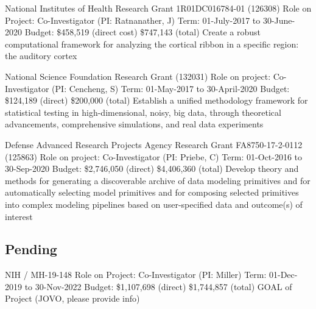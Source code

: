 \documentclass[10pt,colorlinks=true,urlcolor=blue]{moderncv}
\begin{document}
{\newline National Institutes of Health Research Grant 1R01DC016784-01 (126308)
\newline Role on Project: Co-Investigator (PI: Ratnanather, J)
\newline Term: 01-July-2017 to 30-June-2020
\newline Budget: \$458,519 (direct cost) \$747,143 (total)
\newline Create a robust computational framework for analyzing the cortical ribbon in a specific
region: the auditory cortex}{}{}{}{}

{\newline National Science Foundation Research Grant (132031)
\newline Role on project: Co-Investigator (PI: Cencheng, S)
\newline Term: 01-May-2017 to 30-April-2020
\newline Budget: \$124,189 (direct) \$200,000 (total)
\newline Establish a unified methodology framework for statistical testing in high-dimensional, noisy,
big data, through theoretical advancements, comprehensive simulations, and real data
experiments}{}{}{}{}

{\newline Defense Advanced Research Projects Agency Research Grant FA8750-17-2-0112 (125863)
\newline Role on project: Co-Investigator (PI: Priebe, C)
\newline Term: 01-Oct-2016 to 30-Sep-2020
\newline Budget: \$2,746,050 (direct) \$4,406,360 (total)
\newline Develop theory and methods for generating a discoverable archive of data modeling
primitives and for automatically selecting model primitives and for composing selected primitives into complex
modeling pipelines based on user-specified data and outcome(s) of interest}{}{}{}{}

\subsection{Pending}
{\newline NIH / MH-19-148
\newline Role on Project: Co-Investigator (PI: Miller)
\newline Term: 01-Dec-2019 to 30-Nov-2022
\newline Budget: \$1,107,698 (direct) \$1,744,857 (total)
\newline GOAL of Project (JOVO, please provide info)}{}{}{}{}
\end{document}
